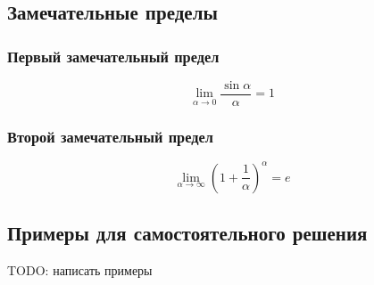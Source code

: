 \documentclass[12pt,a4paper]{article}
\begin{document}
\subsection{Замечательные пределы}
\subsubsection{Первый замечательный предел}
$$ \lim_{\alpha \to 0} \frac{\sin \alpha}{\alpha} = 1 $$
\subsubsection{Второй замечательный предел} 
$$ \lim_{\alpha \to \infty}(1 + \frac{1}{\alpha})^\alpha = e $$
\subsection{Примеры для самостоятельного решения}
TODO: написать примеры
\end{document}
